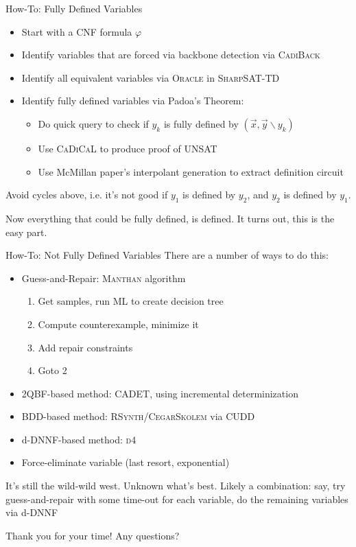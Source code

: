 \documentclass[aspectratio=169]{beamer}
\begin{document}
\begin{frame}{How-To: Fully Defined Variables}
\begin{itemize}
    \item Start with a CNF formula $ \varphi$
    \item Identify variables that are forced via backbone detection
        via \textsc{CadiBack}
    \item Identify all equivalent variables via \textsc{Oracle}
        in \textsc{SharpSAT-TD}
    \item Identify fully defined variables via Padoa's Theorem:
        \begin{itemize}
        \item Do quick query to check if $y_k$ is fully defined by $(\vec{x}, \vec{y} \backslash y_k)$
        \item Use \textsc{CaDiCaL} to produce proof of UNSAT
        \item Use McMillan paper's interpolant generation to extract definition
            circuit
        \end{itemize}
\end{itemize}
\bigskip
Avoid cycles above, i.e. it's not good if $y_1$ is defined by $y_2$, and $y_2$
is defined by $y_1$.
\bigskip

Now everything that could be fully defined, is defined. It turns out, this is
the easy part.
\end{frame}


\begin{frame}{How-To: Not Fully Defined Variables}
There are a number of ways to do this:
\begin{itemize}
    \item Guess-and-Repair: \textsc{Manthan} algorithm
        \begin{enumerate}
            \item Get samples, run ML to create decision tree
            \item Compute counterexample, minimize it
            \item Add repair constraints
            \item Goto 2
        \end{enumerate}
    \item 2QBF-based method: \textsc{CADET}, using incremental determinization
    \item BDD-based method: \textsc{RSynth}/\textsc{CegarSkolem} via \textsc{CUDD}
    \item d-DNNF-based method: \textsc{d4}
    \item Force-eliminate variable (last resort, exponential)
\end{itemize}
\bigskip

It's still the wild-wild west. Unknown what's best. Likely a combination: say, try guess-and-repair with some time-out for each variable, do the remaining variables via d-DNNF
\end{frame}

\begin{frame}{Thank you for your time!}
    Any questions?
\end{frame}
\end{document}
